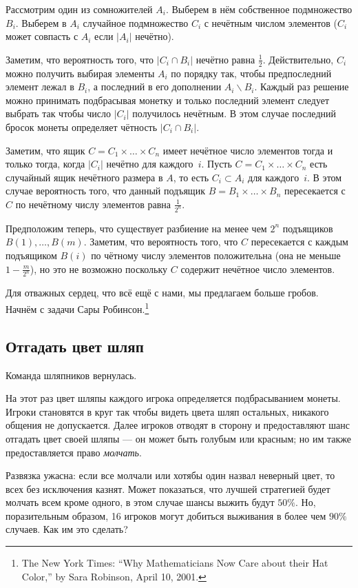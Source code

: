 Рассмотрим один из сомножителей $A_i$. 
Выберем в нём собственное подмножество $B_i$.
Выберем в $A_i$ случайное подмножество $C_i$ с нечётным числом элементов ($C_i$ может совпасть с $A_i$ если $|A_i|$ нечётно).

Заметим, что вероятность того, что $|C_i\cap B_i|$ нечётно равна $\tfrac12$.
Действительно, 
$C_i$ можно получить выбирая элементы $A_i$ по порядку так, чтобы предпоследний элемент лежал в $B_i$, а последний в его дополнении $A_i\backslash B_i$.
Каждый раз решение можно принимать подбрасывая монетку и только последний элемент следует выбрать так чтобы число $|C_i|$ получилось нечётным.
В этом случае последний бросок монеты определяет чётность $|C_i\cap B_i|$.

Заметим, что ящик $C=C_1{\times}\dots{\times}C_n$ имеет нечётное число элементов тогда и только тогда, когда $|C_i|$ нечётно для каждого~$i$.
Пусть $C=C_1{\times}\dots{\times}C_n$ есть случайный ящик нечётного размера в $A$, то есть $C_i\subset A_i$ для каждого~$i$.
В этом случае вероятность того, что данный подъящик $B=B_1{\times}\dots{\times}B_n$ пересекается с $C$ по нечётному числу элементов равна $\tfrac1{2^n}$. %

Предположим теперь, что существует разбиение на менее чем $2^n$ подъящиков $B(1),\dots,B(m)$.
Заметим, что вероятность того, что $C$ пересекается с каждым подъящиком $B(i)$ по чётному числу элементов положительна (она не меньше $1-\tfrac{m}{2^n}$),
но это не возможно поскольку $C$ содержит нечётное число элементов.
\heart

Для отважных сердец, что всё ещё с нами, мы предлагаем больше гробов.
Начнём с задачи Сары Робинсон.\footnote{The New York Times: ``Why Mathematicians Now Care about their Hat Color,'' by Sara Robinson, April 10, 2001.}

\subsection*{Отгадать цвет шляп}

Команда шляпников вернулась.

На этот раз цвет шляпы каждого игрока определяется подбрасыванием монеты.
Игроки становятся в круг так чтобы видеть цвета шляп остальных, никакого общения не допускается.
Далее игроков отводят в сторону и предоставляют шанс отгадать цвет своей шляпы --- он может быть голубым или красным;
но им также предоставляется право \emph{молчать}.

Развязка ужасна: если все молчали или хотябы один назвал неверный цвет, то всех без исключения казнят.
Может показаться, что лучшей стратегией будет молчать всем кроме одного, в этом случае шансы выжить будут $50\%$.
Но, поразительным образом, 16 игроков могут добиться выживания в более чем $90\%$ случаев.
Как им это сделать?

